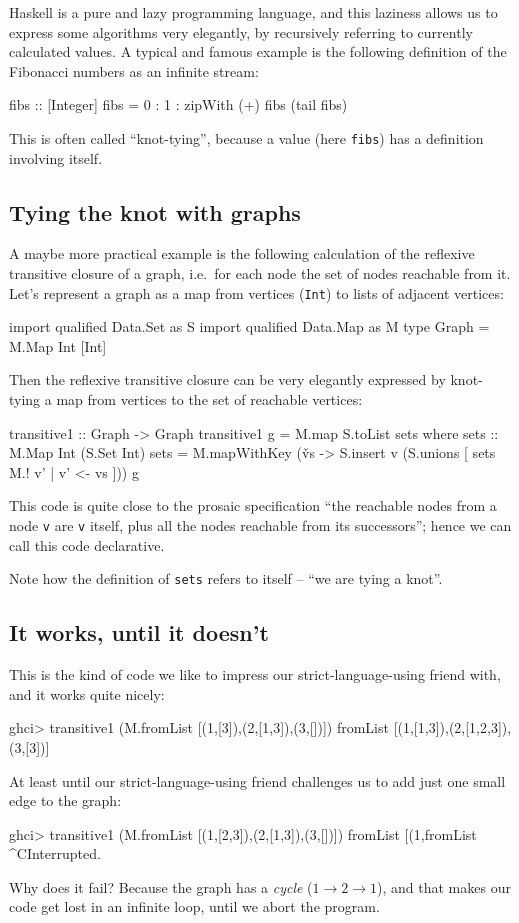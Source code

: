 \documentclass[manuscript,anonymous,screen,acmsmall]{acmart}
\begin{document}
Haskell is a pure and lazy programming language, and this laziness allows us to express some algorithms very elegantly, by recursively referring to currently calculated values. A typical and famous example is the following definition of the Fibonacci numbers as an infinite stream:
\begin{code}
fibs :: [Integer]
fibs = 0 : 1 : zipWith (+) fibs (tail fibs)
\end{code}
This is often called “knot-tying”, because a value (here \verb|fibs|) has a definition involving itself.

\subsection{Tying the knot with graphs}

A maybe more practical example is the following calculation of the reflexive transitive closure of a graph, i.e.\ for each node the set of nodes reachable from it. Let's represent a graph as a map from vertices (\verb|Int|) to lists of adjacent vertices:
\begin{code}
import qualified Data.Set as S
import qualified Data.Map as M
type Graph = M.Map Int [Int]
\end{code}

Then the reflexive transitive closure can be very elegantly expressed by knot-tying a map from vertices to the set of reachable vertices:
\begin{code}
transitive1 :: Graph -> Graph
transitive1 g = M.map S.toList sets
  where
    sets :: M.Map Int (S.Set Int)
    sets = M.mapWithKey (\v vs -> S.insert v (S.unions [ sets M.! v' | v' <- vs ])) g
\end{code}
This code is quite close to the prosaic specification “the reachable nodes from a node \verb|v| are \verb|v| itself, plus all the nodes reachable from its successors”; hence we can call this code declarative.

Note how the definition of \verb|sets| refers to itself -- “we are tying a knot”.

\subsection{It works, until it doesn't}

This is the kind of code we like to impress our strict-language-using friend with, and it works quite nicely:
\begin{code}
ghci> transitive1 (M.fromList [(1,[3]),(2,[1,3]),(3,[])])
fromList [(1,[1,3]),(2,[1,2,3]),(3,[3])]
\end{code}
%
At least until our strict-language-using friend challenges us to add just one small edge to the graph:
\begin{code}
ghci> transitive1 (M.fromList [(1,[2,3]),(2,[1,3]),(3,[])])
fromList [(1,fromList ^CInterrupted.
\end{code}
Why does it fail? Because the graph has a \emph{cycle} ($1 \to 2 \to 1$), and that makes our code get lost in an infinite loop, until we abort the program.
\end{document}
